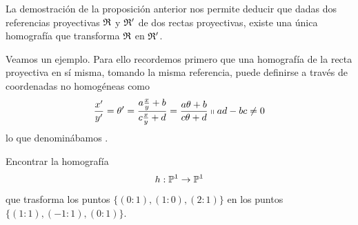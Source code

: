 \begin{obs}
	La demostración de la proposición anterior nos permite deducir que dadas dos referencias proyectivas $\mathfrak{R}$ y $\mathfrak{R'}$ de dos rectas proyectivas, existe una única homografía que transforma $\mathfrak{R}$ en $\mathfrak{R'}$.
\end{obs}
Veamos un ejemplo. Para ello recordemos primero que una homografía de la recta proyectiva en sí misma, tomando la misma referencia,  puede definirse a través de coordenadas no homogéneas como
\begin{equation}
	\label{C5_eq_homografia_nohom}
	\frac{x'}{y'}=\theta'=\frac{a\frac{x}{y}+b}{c\frac{x}{y}+d}=\frac{a\theta+b}{c\theta +d}\shortparallel ad-bc\not=0
\end{equation}
lo que denominábamos .
\begin{exa}
	Encontrar la homografía 
	\[h:\mathbb{P}^1\rightarrow \mathbb{P}^1\] 
	que trasforma los puntos $\{(0:1),(1:0),(2:1)\}$ en los puntos $\{(1:1),(-1:1),(0:1)\}$.\\
	

\end{exa}
